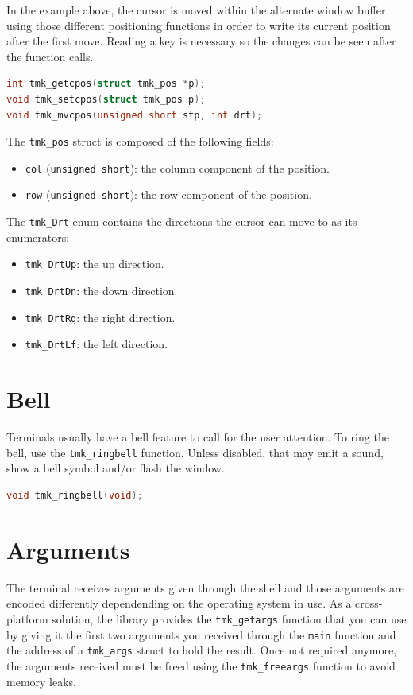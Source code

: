 \documentclass{report}
\begin{document}
In the example above, the cursor is moved within the alternate window buffer using those different positioning functions in order to write its current position after the first move. Reading a key is necessary so the changes can be seen after the function calls.
\begin{lstlisting}[language=c,caption=the declarations of the cursor positioning function.]
int tmk_getcpos(struct tmk_pos *p);
void tmk_setcpos(struct tmk_pos p);
void tmk_mvcpos(unsigned short stp, int drt);
\end{lstlisting}

The \texttt{tmk\_pos} struct is composed of the following fields:
\begin{itemize}
  \item \texttt{col} (\texttt{unsigned short}): the column component of the position.
  \item \texttt{row} (\texttt{unsigned short}): the row component of the position.
\end{itemize}

The \texttt{tmk\_Drt} enum contains the directions the cursor can move to as its enumerators:
\begin{itemize}
  \item \texttt{tmk\_DrtUp}: the up direction.
  \item \texttt{tmk\_DrtDn}: the down direction.
  \item \texttt{tmk\_DrtRg}: the right direction.
  \item \texttt{tmk\_DrtLf}: the left direction.
\end{itemize}
\section{Bell}
Terminals usually have a bell feature to call for the user attention. To ring the bell, use the \texttt{tmk\_ringbell} function. Unless disabled, that may emit a sound, show a bell symbol and/or flash the window.
\begin{lstlisting}[language=c,caption=the declaration of the \texttt{tmk\_ringbell} function.]
void tmk_ringbell(void);
\end{lstlisting}
\section{Arguments}
The terminal receives arguments given through the shell and those arguments are encoded differently dependending on the operating system in use. As a cross-platform solution, the library provides the \texttt{tmk\_getargs} function that you can use by giving it the first two arguments you received through the \texttt{main} function and the address of a \texttt{tmk\_args} struct to hold the result. Once not required anymore, the arguments received must be freed using the \texttt{tmk\_freeargs} function to avoid memory leaks.
\end{document}
